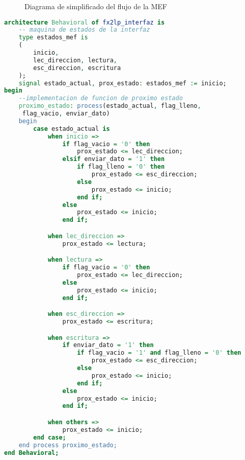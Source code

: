 \begin{figure}[!hb]
	\caption{Diagrama de simplificado del flujo de la MEF}
	\label{fpga:mef:simple}
\end{figure}

\begin{lstlisting}[language=VHDL,backgroundcolor=\color{gray!30}]
architecture Behavioral of fx2lp_interfaz is
	-- maquina de estados de la interfaz
	type estados_mef is
	(
		inicio,
		lec_direccion, lectura,
		esc_direccion, escritura
	);
	signal estado_actual, prox_estado: estados_mef := inicio;
begin
	--implementacion de funcion de proximo estado
	proximo_estado: process(estado_actual, flag_lleno,
	 flag_vacio, enviar_dato)
	begin
		case estado_actual is
			when inicio =>
				if flag_vacio = '0' then
					prox_estado <= lec_direccion;
				elsif enviar_dato = '1' then
					if flag_lleno = '0' then
						prox_estado <= esc_direccion;
					else
						prox_estado <= inicio;
					end if;
				else
					prox_estado <= inicio;
				end if;

			when lec_direccion =>
				prox_estado <= lectura;

			when lectura =>
				if flag_vacio = '0' then
					prox_estado <= lec_direccion;
				else
					prox_estado <= inicio;
				end if;

			when esc_direccion =>
				prox_estado <= escritura;

			when escritura =>
				if enviar_dato = '1' then
					if flag_vacio = '1' and flag_lleno = '0' then
						prox_estado <= esc_direccion;
					else
						prox_estado <= inicio;
					end if;
				else
					prox_estado <= inicio;
				end if;

			when others =>
				prox_estado <= inicio;
		end case;
	end process proximo_estado;
end Behavioral;
\end{lstlisting}


